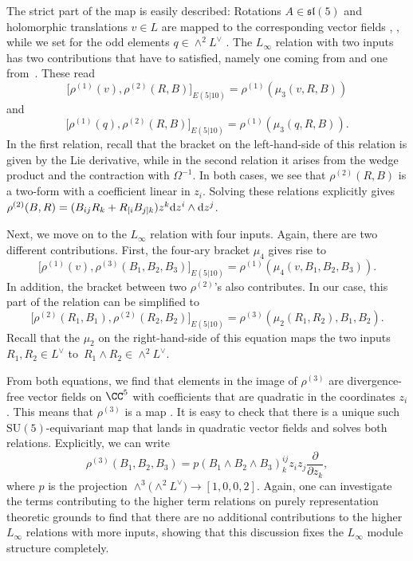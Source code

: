 \documentclass[10pt,a4paper]{amsart}
\numberwithin{equation}{section}
\theoremstyle{definition}
\DeclareMathOperator{\Vect}{Vect}
\def\d{{\rm d}}
\def\SU{\ensuremath{\mathrm{SU}}}
\begin{document}
The strict part of the map is easily described: Rotations $A \in \mathfrak{sl}(5)$ and holomorphic translations $v \in L$ are mapped to the corresponding vector fields
, ,
while we set for the odd elements $q \in \wedge^2 L^\vee$
\smash{$
 \rho^{(1)}(q) = q_{ij} \d z^i \wedge \d z^j$}.
The $L_\infty$ relation with two inputs has two contributions that have to satisfied, namely one coming from  and one from~. These read
\[
 \big[\rho^{(1)}(v) , \rho^{(2)} (R,B)\big]_{E(5|10)} = \rho^{(1)}(\mu_3(v,R,B))
\]
and
\[
 \big[\rho^{(1)}(q) , \rho^{(2)}(R,B)\big]_{E(5|10)} = \rho^{(1)}(\mu_3(q,R,B)).
\]
In the first relation, recall that the bracket on the left-hand-side of this relation is given by the Lie derivative, while in the second relation it arises from the wedge product and the contraction with $\Omega^{-1}$. In both cases, we see that $\rho^{(2)}(R,B)$ is a two-form with a coefficient linear in $z_i$. Solving these relations explicitly gives
$
 \rho^{(2)}(B,R) = (B_{ij} R_k + R_{[i} B_{j]k} ) z^k \d z^i \wedge \d z^j$.

Next, we move on to the $L_\infty$ relation with four inputs. Again, there are two different contributions. First, the four-ary bracket $\mu_4$ gives rise to
\[
 \big[\rho^{(1)}(v), \rho^{(3)}(B_1,B_2,B_3)\big]_{E(5|10)} = \rho^{(1)}(\mu_4(v,B_1,B_2,B_3)).
\]
In addition, the bracket between two $\rho^{(2)}$'s also contributes. In our case, this part of the relation can be simplified to
\[
 \big[\rho^{(2)}(R_1, B_1) , \rho^{(2)}(R_2,B_2)\big]_{E(5|10)} = \rho^{(3)}(\mu_2(R_1,R_2), B_1,B_2).
\]
Recall that the $\mu_2$ on the right-hand-side of this equation maps the two inputs $R_1, R_2 \in L^\vee$ to~${R_1 \wedge R_2 \in \wedge^2 L^\vee}$.

From both equations, we find that elements in the image of $\rho^{(3)}$ are divergence-free vector fields on $\CC^5$ with coefficients that are quadratic in the coordinates $z_i$. This means that $\rho^{(3)}$ is a map
\smash{$
 \rho^{(3)}\colon \wedge^3\big(\wedge^2 L^\vee\big) \longrightarrow \Vect_0\big(\CC^5\big)$}.
It is easy to check that there is a unique such $\SU(5)$-equivariant map that lands in quadratic vector fields and solves both relations. Explicitly, we can write
\[
 \rho^{(3)}(B_1,B_2,B_3) = p(B_1 \wedge B_2 \wedge B_3)^{ij}_k z_i z_j \frac{\partial}{\partial z_k},
\]
where $p$ is the projection $\wedge^3\bigl(\wedge^2 L^\vee\bigr) \rightarrow [1,0,0,2]$.
Again, one can investigate the terms contributing to the higher term relations on purely representation theoretic grounds to find that there are no additional contributions to the higher $L_\infty$ relations with more inputs, showing that this discussion fixes the $L_\infty$ module structure completely.
\end{document}
